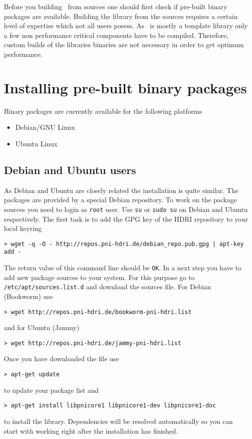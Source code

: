 
Before you building \libpnicore\ from sources one should first check if
pre-built binary packages are available. Building the library from the sources
requires a certain level of expertise which not all users posess.
As
\libpnicore\ is mostly a template library only a few non performance critical
components have to be compiled. Therefore, custom builds of the libraries
binaries are not necessary in order to get optimum performance.

\section{Installing pre-built binary packages}

Binary packages are currently available for the following platforms
\begin{itemize}
\item Debian/GNU Linux
\item Ubuntu Linux
\end{itemize}

\subsection{Debian and Ubuntu users}

As Debian and Ubuntu are closely related the installation is quite similar.
The packages are provided by a special Debian repository. To work on the package
sources you need to login as \texttt{root} user. Use \texttt{su} or \texttt{sudo su} on
Debian and Ubuntu respectively.
The first task is to add the GPG key of the HDRI repository to your local
keyring
\begin{verbatim}
> wget -q -O - http://repos.pni-hdri.de/debian_repo.pub.gpg | apt-key add -
\end{verbatim}
The return value of this command line should be \texttt{OK}.
In a next step you have to add new package sources to your system. For this
purpose go to \texttt{/etc/apt/sources.list.d} and download the sources file.
For Debian (Bookworm) use
\begin{verbatim}
> wget http://repos.pni-hdri.de/bookworm-pni-hdri.list
\end{verbatim}
and for Ubuntu (Jammy)
\begin{verbatim}
> wget http://repos.pni-hdri.de/jammy-pni-hdri.list
\end{verbatim}
Once you have downloaded the file use
\begin{verbatim}
> apt-get update
\end{verbatim}
to update your package list and
\begin{verbatim}
> apt-get install libpnicore1 libpnicore1-dev libpnicore1-doc
\end{verbatim}
to install the library. Dependencies will be resolved automatically so you can
start with working right after the installation has finished.


